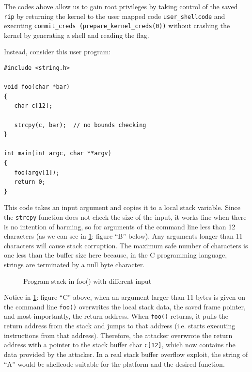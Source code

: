 \documentclass{masterthesis}
\begin{document}
The codes above allow us to gain root privileges by taking control of the saved \texttt{rip} by returning the kernel to the user mapped code \texttt{user_shellcode} and executing \texttt{commit_creds (prepare_kernel_creds(0))} without crashing the kernel by generating a shell and reading the flag.

Instead, consider this user program:
\begin{lstlisting}
#include <string.h>

void foo(char *bar)
{
   char c[12];

   strcpy(c, bar);  // no bounds checking
}

int main(int argc, char **argv)
{
   foo(argv[1]);
   return 0;
}
\end{lstlisting}
This code takes an input argument and copies it to a local stack variable. Since the \texttt{strcpy} function does not check the size of the input, it works fine when there is no intention of harming, so for arguments of the command line less than 12 characters (as we can see in \ref{figure:stackoverflow}: figure ``B'' below). Any arguments longer than 11 characters will cause stack corruption. The maximum safe number of characters is one less than the buffer size here because, in the C programming language, strings are terminated by a null byte character. 

\begin{figure}[h!]
   \caption{Program stack in foo() with different input}
   \label{figure:stackoverflow}
\end{figure} 

Notice in \ref{figure:stackoverflow}: figure ``C'' above, when an argument larger than 11 bytes is given on the command line \texttt{foo()} overwrites the local stack data, the saved frame pointer, and most importantly, the return address. When \texttt{foo()} returns, it pulls the return address from the stack and jumps to that address (i.e. starts executing instructions from that address). Therefore, the attacker overwrote the return address with a pointer to the stack buffer char \texttt{c[12]}, which now contains the data provided by the attacker. In a real stack buffer overflow exploit, the string of ``A'' would be shellcode suitable for the platform and the desired function.
\end{document}
